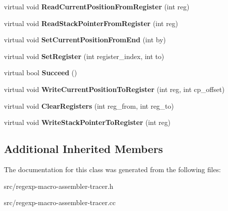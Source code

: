 \begin{DoxyCompactItemize}
\item 
\hypertarget{classv8_1_1internal_1_1_reg_exp_macro_assembler_tracer_aa5ff8d2f34b05b425a3a96069b3ddb67}{}virtual void {\bfseries Read\+Current\+Position\+From\+Register} (int reg)\label{classv8_1_1internal_1_1_reg_exp_macro_assembler_tracer_aa5ff8d2f34b05b425a3a96069b3ddb67}

\item 
\hypertarget{classv8_1_1internal_1_1_reg_exp_macro_assembler_tracer_aa8956d769bf9805a147d50819276c1eb}{}virtual void {\bfseries Read\+Stack\+Pointer\+From\+Register} (int reg)\label{classv8_1_1internal_1_1_reg_exp_macro_assembler_tracer_aa8956d769bf9805a147d50819276c1eb}

\item 
\hypertarget{classv8_1_1internal_1_1_reg_exp_macro_assembler_tracer_a8950672d4382b2d1213345709bb64141}{}virtual void {\bfseries Set\+Current\+Position\+From\+End} (int by)\label{classv8_1_1internal_1_1_reg_exp_macro_assembler_tracer_a8950672d4382b2d1213345709bb64141}

\item 
\hypertarget{classv8_1_1internal_1_1_reg_exp_macro_assembler_tracer_ab01c1345e811ad7b179f992b67740eee}{}virtual void {\bfseries Set\+Register} (int register\+\_\+index, int to)\label{classv8_1_1internal_1_1_reg_exp_macro_assembler_tracer_ab01c1345e811ad7b179f992b67740eee}

\item 
\hypertarget{classv8_1_1internal_1_1_reg_exp_macro_assembler_tracer_a480549d020434f6c8272ba1e1ef9b574}{}virtual bool {\bfseries Succeed} ()\label{classv8_1_1internal_1_1_reg_exp_macro_assembler_tracer_a480549d020434f6c8272ba1e1ef9b574}

\item 
\hypertarget{classv8_1_1internal_1_1_reg_exp_macro_assembler_tracer_a9eb13ba0f2ffd919bc5d4348c6f831a9}{}virtual void {\bfseries Write\+Current\+Position\+To\+Register} (int reg, int cp\+\_\+offset)\label{classv8_1_1internal_1_1_reg_exp_macro_assembler_tracer_a9eb13ba0f2ffd919bc5d4348c6f831a9}

\item 
\hypertarget{classv8_1_1internal_1_1_reg_exp_macro_assembler_tracer_ad73a9a1d736bdddec6ca4a714cdbbf31}{}virtual void {\bfseries Clear\+Registers} (int reg\+\_\+from, int reg\+\_\+to)\label{classv8_1_1internal_1_1_reg_exp_macro_assembler_tracer_ad73a9a1d736bdddec6ca4a714cdbbf31}

\item 
\hypertarget{classv8_1_1internal_1_1_reg_exp_macro_assembler_tracer_ad1bc0faf47d26c2a3bdcd3b053525876}{}virtual void {\bfseries Write\+Stack\+Pointer\+To\+Register} (int reg)\label{classv8_1_1internal_1_1_reg_exp_macro_assembler_tracer_ad1bc0faf47d26c2a3bdcd3b053525876}

\end{DoxyCompactItemize}
\subsection*{Additional Inherited Members}


The documentation for this class was generated from the following files\+:\begin{DoxyCompactItemize}
\item 
src/regexp-\/macro-\/assembler-\/tracer.\+h\item 
src/regexp-\/macro-\/assembler-\/tracer.\+cc\end{DoxyCompactItemize}
